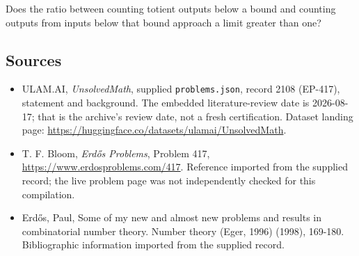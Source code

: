 \documentclass[11pt,a4paper]{article}
\begin{document}
Does the ratio between counting totient outputs below a bound and counting outputs from inputs below that bound approach a limit greater than one?

\subsection{Sources}

{\small

\begin{itemize}

\item[\hypertarget{source:2108:1}{S1}] ULAM.AI, \emph{UnsolvedMath}, supplied \texttt{problems.json}, record 2108 (EP-417), statement and background. The embedded literature-review date is 2026-08-17; that is the archive’s review date, not a fresh certification. Dataset landing page: \url{https://huggingface.co/datasets/ulamai/UnsolvedMath}.

\item[\hypertarget{source:2108:2}{S2}] T. F. Bloom, \emph{Erdős Problems}, Problem 417, \url{https://www.erdosproblems.com/417}. Reference imported from the supplied record; the live problem page was not independently checked for this compilation.

\item[\hypertarget{source:2108:3}{S3}] Erd\H{o}s, Paul, Some of my new and almost new problems and results in combinatorial number theory. Number theory (Eger, 1996) (1998), 169-180. Bibliographic information imported from the supplied record.

\end{itemize}

}

\label{end:2108}
\end{document}
